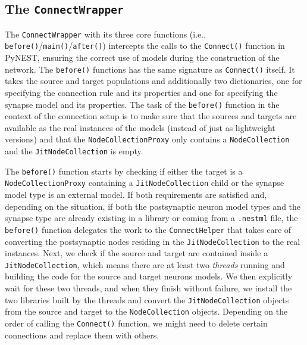 \subsection{The \texttt{ConnectWrapper}}

The \texttt{ConnectWrapper} with its three core functions (i.e., \texttt{before()}/\texttt{main()}/\texttt{after()}) intercepts the calls to the \texttt{Connect()} function in PyNEST, ensuring the correct use of models during the construction of the network. The \texttt{before()} functions has the same signature as \texttt{Connect()} itself. It takes the source and target populations and additionally two dictionaries, one for specifying the connection rule and its properties and one for specifying the synapse model and its properties. The task of the \texttt{before()} function in the context of the connection setup is to make sure that the sources and targets are available as the real instances of the models (instead of just as lightweight versions) and that the \texttt{NodeCollectionProxy} only contains a \texttt{NodeCollection} and the \texttt{JitNodeCollection} is empty.

The \texttt{before()} function starts by checking if either the target is a \texttt{NodeCollectionProxy} containing a \texttt{JitNodeCollection} child or the synapse model type is an external model. If both requirements are satisfied and, depending on the situation, if both the postsynaptic neuron model types and the synapse type are already existing in a library or coming from a \texttt{.nestml} file, the \texttt{before()} function delegates the work to the \texttt{ConnectHelper} that takes care of converting the postsynaptic nodes residing in the \texttt{JitNodeCollection} to the real instances. Next, we check if the source and target are contained inside a \texttt{JitNodeCollection}, which means there are at least two \emph{threads} running and building the code for the source and target neurons models. We then explicitly wait for these two threads, and when they finish without failure, we install the two libraries built by the threads and convert the \texttt{JitNodeCollection} objects from the source and target to the \texttt{NodeCollection} objects. Depending on the order of calling the \texttt{Connect()} function, we might need to delete certain connections and replace them with others.

